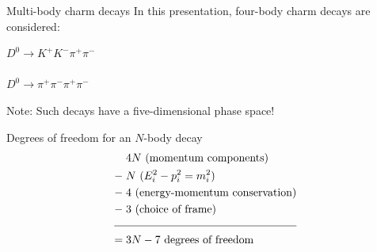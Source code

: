 \documentclass[xcolor={dvipsnames}]{beamer}
\begin{document}
\begin{frame}{Multi-body charm decays}
  \vspace{0.0cm}
  {\large In this presentation, four-body charm decays are considered:}
  \begin{center}
    {\Large
    $D^0\to K^+K^-\pi^+\pi^-$ \\~\\
    $D^0\to\pi^+\pi^-\pi^+\pi^-$}
  \end{center}
  \vspace{0.2cm}
  Note: Such decays have a five-dimensional phase space!
  \scriptsize
  \begin{center}
    \begin{minipage}{0.6\textwidth}
      \begin{block}{\centering Degrees of freedom for an $N$-body decay}
        \vspace{-0.5cm}
        \begin{align*}
          &4N \text{ (momentum components)} \\
          -\;&N \text{ ($E_i^2-p_i^2=m_i^2$)} \\
          -\;&4 \text{ (energy-momentum conservation)} \\
          -\;&3 \text{ (choice of frame)} \\[-0.1cm]
          \cline{1-2}\\[-0.5cm]
          =\;&3N-7 \text{ degrees of freedom}
        \end{align*}
      \end{block}
    \end{minipage}
  \end{center}
\end{frame}
\end{document}
